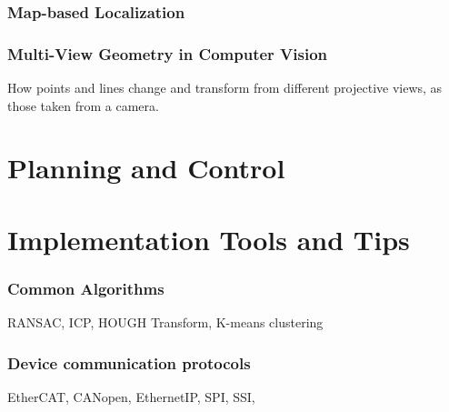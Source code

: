 \documentclass[a4paper,11pt]{article}
\begin{document}
\newpage
\section{Map-based Localization}

\newpage


\newpage
\section{Multi-View Geometry in Computer Vision}
How points and lines change and transform from different projective views, as those taken from a camera.



\newpage
\part{Planning and Control}

\newpage



\newpage
\part{Implementation Tools and Tips}

\newpage
\section{Common Algorithms}
RANSAC, ICP, HOUGH Transform, K-means clustering

\newpage
\section{Device communication protocols}
EtherCAT, CANopen, Ethernet\/IP, SPI, SSI, 


\newpage


\end{document}
